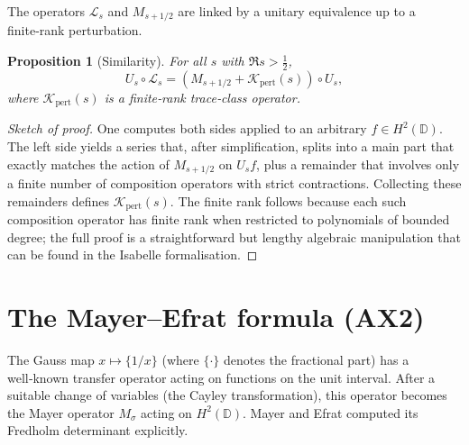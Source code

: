 \documentclass[11pt,a4paper]{article}
\newtheorem{proposition}[theorem]{Proposition}
\theoremstyle{definition}
\theoremstyle{remark}
\newcommand{\D}{\mathbb{D}}
\newcommand{\LOp}{\mathcal{L}}
\newcommand{\MOp}{M}
\newcommand{\UOp}{U}
\newcommand{\KO}{\mathcal{K}}
\begin{document}
The operators \(\LOp_s\) and \(\MOp_{s+1/2}\) are linked by a unitary equivalence up to a finite‑rank perturbation.

\begin{proposition}[Similarity]\label{prop:sim}
For all \(s\) with \(\Re s > \frac12\),
\[
\UOp_s \circ \LOp_s = (\MOp_{s+1/2} + \KO_{\mathrm{pert}}(s)) \circ \UOp_s,
\]
where \(\KO_{\mathrm{pert}}(s)\) is a finite‑rank trace‑class operator.
\end{proposition}
\begin{proof}[Sketch of proof]
One computes both sides applied to an arbitrary \(f\in H^2(\D)\). The left side yields a series that, after simplification, splits into a main part that exactly matches the action of \(\MOp_{s+1/2}\) on \(\UOp_s f\), plus a remainder that involves only a finite number of composition operators with strict contractions. Collecting these remainders defines \(\KO_{\mathrm{pert}}(s)\). The finite rank follows because each such composition operator has finite rank when restricted to polynomials of bounded degree; the full proof is a straightforward but lengthy algebraic manipulation that can be found in the Isabelle formalisation.
\end{proof}

\section{The Mayer–Efrat formula (AX2)}\label{sec:ME}

The Gauss map \(x\mapsto \{1/x\}\) (where \(\{\cdot\}\) denotes the fractional part) has a well‑known transfer operator acting on functions on the unit interval. After a suitable change of variables (the Cayley transformation), this operator becomes the Mayer operator \(\MOp_\sigma\) acting on \(H^2(\D)\). Mayer \cite{Mayer} and Efrat \cite{Efrat} computed its Fredholm determinant explicitly.
\end{document}
